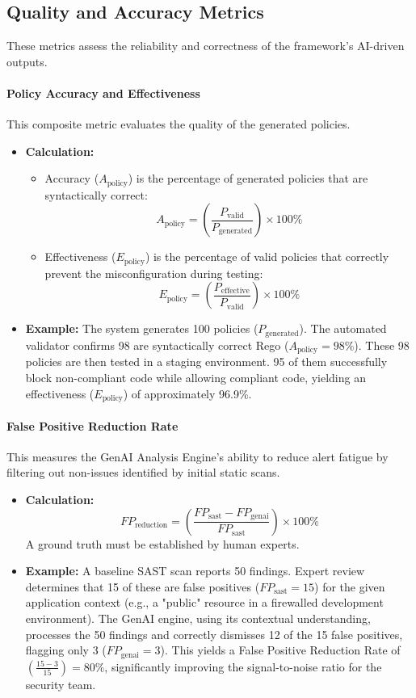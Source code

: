 \subsection*{Quality and Accuracy Metrics}
These metrics assess the reliability and correctness of the framework's AI-driven outputs.

\paragraph{Policy Accuracy and Effectiveness} This composite metric evaluates the quality of the generated policies.
\begin{itemize}
    \item \textbf{Calculation:}
        \begin{itemize}
            \item Accuracy (\( A_{\text{policy}} \)) is the percentage of generated policies that are syntactically correct:
            \[ A_{\text{policy}} = \left(\frac{P_{\text{valid}}}{P_{\text{generated}}}\right) \times 100\% \]
            \item Effectiveness (\( E_{\text{policy}} \)) is the percentage of valid policies that correctly prevent the misconfiguration during testing:
            \[ E_{\text{policy}} = \left(\frac{P_{\text{effective}}}{P_{\text{valid}}}\right) \times 100\% \]
        \end{itemize}
    \item \textbf{Example:} The system generates 100 policies (\( P_{\text{generated}} \)). The automated validator confirms 98 are syntactically correct Rego (\( A_{\text{policy}} = 98\% \)). These 98 policies are then tested in a staging environment. 95 of them successfully block non-compliant code while allowing compliant code, yielding an effectiveness (\( E_{\text{policy}} \)) of approximately 96.9\%.
\end{itemize}

\paragraph{False Positive Reduction Rate} This measures the GenAI Analysis Engine's ability to reduce alert fatigue by filtering out non-issues identified by initial static scans.
\begin{itemize}
    \item \textbf{Calculation:} \[ FP_{\text{reduction}} = \left(\frac{FP_{\text{sast}} - FP_{\text{genai}}}{FP_{\text{sast}}}\right) \times 100\% \] A ground truth must be established by human experts.
    \item \textbf{Example:} A baseline SAST scan reports 50 findings. Expert review determines that 15 of these are false positives (\( FP_{\text{sast}} = 15 \)) for the given application context (e.g., a "public" resource in a firewalled development environment). The GenAI engine, using its contextual understanding, processes the 50 findings and correctly dismisses 12 of the 15 false positives, flagging only 3 (\( FP_{\text{genai}} = 3 \)). This yields a False Positive Reduction Rate of \( \left(\frac{15 - 3}{15}\right) = 80\% \), significantly improving the signal-to-noise ratio for the security team.
\end{itemize}

